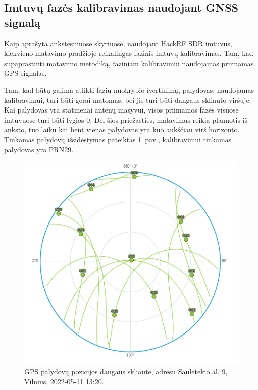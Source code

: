 \documentclass[main.tex]{subfiles}
\begin{document}
\subsection{Imtuvų fazės kalibravimas naudojant GNSS signalą}\label{sec:phase_clib_using_gnss}

Kaip aprašyta ankstesniuose skyriuose, naudojant HackRF SDR imtuvus, kiekvieno
matavimo pradžioje reikalingas fazinis imtuvų kalibravimas. Tam, kad supaprastinti
matavimo metodiką, faziniam kalibravimui naudojamas priimamas GPS signalas.

Tam, kad būtų galima atlikti fazių nuokrypio įvertinimą, palydovas, naudojamas kalibravimui,
turi būti gerai matomas, bei jis turi būti dangaus skliauto viršuje.
Kai palydovas yra statmenai antenų masyvui, visos priimamos fazės visuose
imtuvuose turi būti lygios 0. Dėl šios priežasties, matavimus reikia
planuotis iš anksto, tuo laiku kai bent vienas palydovas yra
kuo aukščiau virš horizonto. Tinkamas palydovų išsidėstymas
pateiktas \ref{fig:gnss_sat_pos_calibartion}~pav.,
kalibravimui tinkamas palydovas yra PRN29.

\begin{figure}[ht]
    \begin{centering}
    \includegraphics[scale=1.2]{drawings/gnss_sattelites_position}
    \par\end{centering}
    \protect\caption{\label{fig:gnss_sat_pos_calibartion}GPS palydovų pozicijos dangaus skliaute, adresu Saulėtekio al. 9, Vilnius, 2022-05-11 13:20.}
\end{figure}
\end{document}
